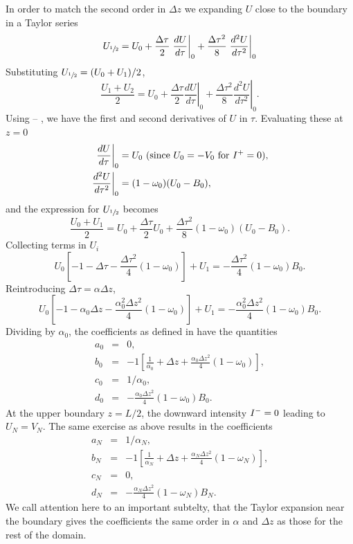 In order to match the second order in $\Delta z$ we expanding $U$ close to the boundary in a Taylor series
\begin{equation}
    U_{\sfrac{1}{2}} = U_0 + \frac{\Delta \tau}{2} \left. \frac{dU}{d\tau} \right|_0 + \frac{\Delta \tau^2}{8} \left. \frac{d^2U}{d\tau^2}\right|_0
\end{equation}
Substituting $U_{\sfrac{1}{2}} = (U_0 + U_1)/2$,
\begin{equation}
    \frac{U_1 + U_2}{2} = U_0 + \frac{\Delta \tau}{2} \left. \frac{dU}{d\tau} \right|_0 + \frac{\Delta \tau^2}{8} \left. \frac{d^2U}{d\tau^2}\right|_0.
\end{equation}
Using  -- , we have the first and second derivatives of $U$ in $\tau$.
Evaluating these at $z=0$
\begin{align}
    \left. \frac{dU}{d\tau} \right|_0 &= U_0 \text{  (since}\ U_0=-V_0 \text{ for } \Iplus=0), \\
    \left. \frac{d^2U}{d\tau^2}\right|_0 &= (1-\omega_0)(U_0-B_0),
\end{align}
and the expression for $U_{\sfrac{1}{2}}$ becomes
\begin{equation}
    \frac{U_0 + U_1}{2} = U_0 + \frac{\Delta \tau}{2} U_0 + \frac{\Delta \tau^2}{8} (1-\omega_0)(U_0-B_0).
\end{equation}
Collecting terms in $U_i$
\begin{equation}
    U_0 \left[ -1-\Delta \tau - \frac{\Delta \tau^2}{4}(1-\omega_0) \right] + U_1 = - \frac{\Delta \tau^2}{4}(1-\omega_0)B_0.
\end{equation}
Reintroducing $\Delta \tau =\alpha \Delta z$,
\begin{equation}
    U_0 \left[ -1-\alpha_0\Delta z - \frac{\alpha_0^2\Delta z^2}{4}(1-\omega_0) \right] + U_1 = - \frac{\alpha_0^2\Delta z^2}{4}(1-\omega_0)B_0.
\end{equation}
Dividing by $\alpha_0$, the coefficients as defined in  have the quantities
\begin{eqnarray}
    a_0 &=& 0, \\
    b_0 &=& -1\left[ \frac{1}{\alpha_0} + \Delta z + \frac{\alpha_0 \Delta z^2}{4}(1-\omega_0) \right], \\
    c_0 &=& 1/\alpha_{0}, \\
    d_0 &=& - \frac{\alpha_0 \Delta z^2}{4}(1-\omega_0) B_0.
\end{eqnarray}
At the upper boundary $z=L/2$, the downward intensity $I^-=0$ leading to $U_N=V_N$.
The same exercise as above results in the coefficients
\begin{eqnarray}
    a_N &=& 1/\alpha_N, \\
    b_N &=& -1\left[ \frac{1}{\alpha_N} + \Delta z + \frac{\alpha_N \Delta z^2}{4}(1-\omega_N) \right], \\
    c_N &=& 0, \\
    d_N &=& - \frac{\alpha_N \Delta z^2}{4}(1-\omega_N) B_N.
\end{eqnarray}
We call attention here to an important subtelty, that the Taylor expansion near the boundary gives the coefficients the same order in $\alpha$ and $\Delta z$ as those for the rest of the domain.


